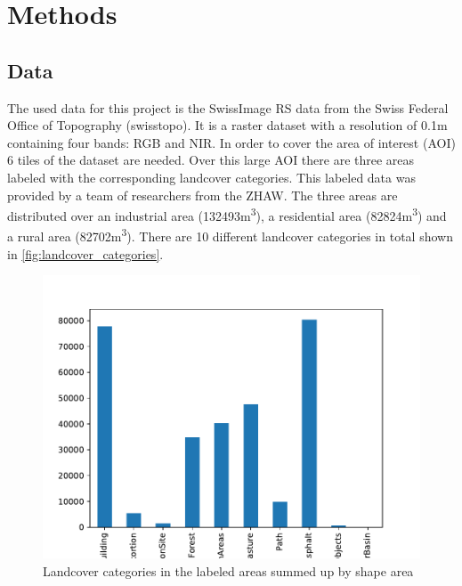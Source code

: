 

\section{Methods}
\label{methods}

\subsection{Data}%

The used data for this project is the SwissImage RS data from the Swiss Federal Office of Topography (swisstopo).
It is a raster dataset with a resolution of 0.1m containing four bands: RGB and NIR.
In order to cover the area of interest (AOI) 6 tiles of the dataset are needed.
Over this large AOI there are three areas labeled with the corresponding landcover categories.
This labeled data was provided by a team of researchers from the ZHAW. The three
areas are distributed over an industrial area (132493m\textsuperscript{3}), 
a residential area (82824m\textsuperscript{3}) and a rural area (82702m\textsuperscript{3}).
There are 10 different landcover categories in total shown in \autoref{fig:landcover_categories}.

\begin{figure}[H]
    \centering
    \captionsetup{width=0.8\linewidth}
    \includegraphics[scale=0.6]{figures/area_by_category.pdf}
    \caption{Landcover categories in the labeled areas summed up by shape area}
    \label{fig:landcover_categories}
\end{figure}

